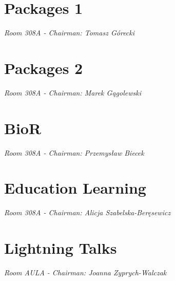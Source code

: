 \documentclass[11pt,twoside,b5paper]{book}
\begin{document}
\chapter{Packages 1}{\LARGE \textit{Room 308A - Chairman: Tomasz Górecki}}




% 


\chapter{Packages 2}{\LARGE \textit{Room 308A - Chairman: Marek Gągolewski}}




% 

\chapter{BioR}{\LARGE \textit{Room 308A - Chairman: Przemysław Biecek}}



\newpage



\chapter{Education Learning}{\LARGE \textit{Room 308A - Chairman: Alicja Szabelska-Beręsewicz}}





\chapter{Lightning Talks}{\LARGE \textit{Room AULA - Chairman: Joanna Zyprych-Walczak}}

\newpage












\end{document}
